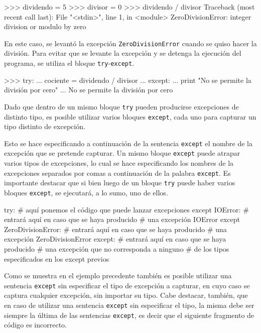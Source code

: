 \begin{codigo-python-sn}
>>> dividendo = 5
>>> divisor = 0
>>> dividendo / divisor
Traceback (most recent call last):
  File "<stdin>", line 1, in <module>
ZeroDivisionError: integer division or modulo by zero
\end{codigo-python-sn}

En este caso, se levantó la excepción \lstinline!ZeroDivisionError! cuando se
quiso hacer la división.  Para evitar que se levante la excepción y se detenga
la ejecución del programa, se utiliza el bloque
\lstinline!try!-\lstinline!except!.

\begin{codigo-python-sn}
>>> try:
...     cociente = dividendo / divisor
... except:
...     print "No se permite la división por cero"
... 
No se permite la división por cero
\end{codigo-python-sn}

Dado que dentro de un mismo bloque \lstinline!try! pueden producirse
excepciones de distinto tipo, es posible utilizar varios bloques
\lstinline!except!, cada uno para capturar un tipo distinto de excepción. 

Esto se hace especificando a continuación de la sentencia
\lstinline!except! el nombre de la excepción que se pretende capturar. Un
mismo bloque \lstinline!except! puede atrapar varios tipos de excepciones,
lo cual se hace especificando los nombres de la excepciones separados por
comas a continuación de la palabra \lstinline!except!. Es importante
destacar que si bien luego de un bloque \lstinline!try! puede haber varios
bloques \lstinline!except!, se ejecutará, a lo sumo, uno de ellos.

\begin{codigo-python-sn}
try:
	# aquí ponemos el código que puede lanzar excepciones
except IOError:
	# entrará aquí en caso que se haya producido
	# una excepción IOError
except ZeroDivisionError:
	# entrará aquí en caso que se haya producido
	# una excepción ZeroDivisionError
except:
	# entrará aquí en caso que se haya producido
	# una excepción que no corresponda a ninguno
	# de los tipos especificados en los except previos
\end{codigo-python-sn}

Como se muestra en el ejemplo precedente también es posible utilizar una
sentencia \lstinline!except! sin especificar el tipo de excepción a
capturar, en cuyo caso se captura cualquier excepción, sin importar su
tipo. Cabe destacar, también, que en caso de utilizar una sentencia
\lstinline!except! sin especificar el tipo, la misma debe ser siempre la
última de las sentencias \lstinline!except!, es decir que el siguiente
fragmento de código es incorrecto.

